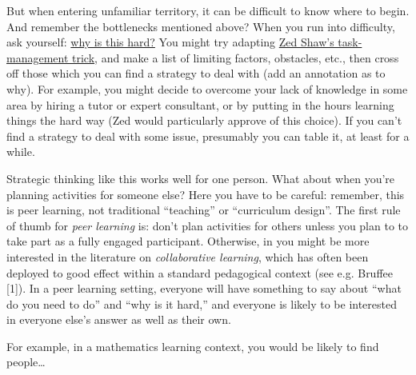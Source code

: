 But when entering unfamiliar territory, it can be difficult to know
where to begin. And remember the bottlenecks mentioned above? When you
run into difficulty, ask yourself:
\href{http://peeragogy.org/patterns-and-heuristics/}{why is this hard?}
You might try adapting
\href{http://learnpythonthehardway.org/book/intro.html\#comment-409972596}{Zed
Shaw's task-management trick}, and make a list of limiting factors,
obstacles, etc., then cross off those which you can find a strategy to
deal with (add an annotation as to why). For example, you might decide
to overcome your lack of knowledge in some area by hiring a tutor or
expert consultant, or by putting in the hours learning things the hard
way (Zed would particularly approve of this choice). If you can't find a
strategy to deal with some issue, presumably you can table it, at least
for a while.

Strategic thinking like this works well for one person. What about when
you're planning activities for someone else? Here you have to be
careful: remember, this is peer learning, not traditional ``teaching''
or ``curriculum design''. The first rule of thumb for \emph{peer
learning} is: don't plan activities for others unless you plan to to
take part as a fully engaged participant. Otherwise, in you might be
more interested in the literature on \emph{collaborative learning},
which has often been deployed to good effect within a standard
pedagogical context (see e.g. Bruffee {[}1{]}). In a peer learning
setting, everyone will have something to say about ``what do you need to
do'' and ``why is it hard,'' and everyone is likely to be interested in
everyone else's answer as well as their own.

For example, in a mathematics learning context, you would be likely to
find people\ldots{}

